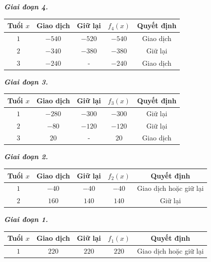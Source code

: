 \documentclass[12pt,a4paper]{article}
\begin{document}
\textbf{\textit{Giai đoạn 4.}}
\begin{center}
\begin{table}[H]
\begin{tabular}{|c|c|c|c|c|}
\hline 
Tuổi \(x\) & Giao dịch & Giữ lại & \(f_4 \left( x \right)\) & Quyết định \\ 
\hline 
\(1\) & \(-540\) & \(-520\) & \(-540\) & Giao dịch \\ 
\hline 
\(2\) & \(-340\) & \(-380\) & \(-380\) & Giữ lại \\ 
\hline 
\(3\) & \(-240\) & - & \(-240\) & Giao dịch \\ 
\hline 
\end{tabular} 
\end{table}
\end{center}
\textbf{\textit{Giai đoạn 3.}}
\begin{center}
\begin{table}[H]
\begin{tabular}{|c|c|c|c|c|}
\hline 
Tuổi \(x\) & Giao dịch & Giữ lại & \(f_3 \left( x \right)\) & Quyết định \\ 
\hline 
\(1\) & \(-280\) & \(-300\) & \(-300\) & Giữ lại \\ 
\hline 
\(2\) & \(-80\) & \(-120\) & \(-120\) & Giữ lại \\ 
\hline 
\(3\) & \(20\) & - & \(20\) & Giao dịch \\ 
\hline 
\end{tabular} 
\end{table}
\end{center}
\textbf{\textit{Giai đoạn 2.}}
\begin{center}
\begin{table}[H]
\begin{tabular}{|c|c|c|c|c|}
\hline 
Tuổi \(x\) & Giao dịch & Giữ lại & \(f_2 \left( x \right)\) & Quyết định \\ 
\hline 
\(1\) & \(-40\) & \(-40\) & \(-40\) & Giao dịch hoặc giữ lại \\ 
\hline 
\(2\) & \(160\) & \(140\) & \(140\) & Giữ lại \\ 
\hline 
\end{tabular} 
\end{table}
\end{center}
\textbf{\textit{Giai đoạn 1.}}
\begin{center}
\begin{table}[H]
\begin{tabular}{|c|c|c|c|c|}
\hline 
Tuổi \(x\) & Giao dịch & Giữ lại & \(f_1 \left( x \right)\) & Quyết định \\ 
\hline 
\(1\) & \(220\) & \(220\) & \(220\) & Giao dịch hoặc giữ lại \\ 
\hline 
\end{tabular} 
\end{table}
\end{center}
\end{document}
